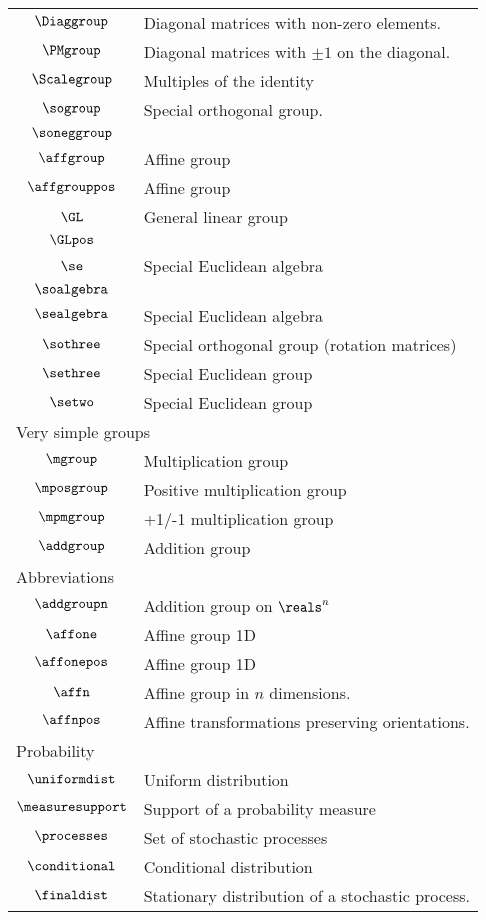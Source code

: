 \begin{longtable}{cl}
 $\Diaggroup$ &   Diagonal matrices with non-zero elements.\\ 
 $\PMgroup$ &   Diagonal matrices with $\pm 1$ on the diagonal.\\ 
 $\Scalegroup$ &   Multiples of the identity\\ 
 $\sogroup$ &  Special orthogonal group.\\ 
 $\soneggroup$ & \\ 
 $\affgroup$ &  Affine group \\ 
 $\affgrouppos$ &  Affine group \\ 
 $\GL$ &  General linear group\\ 
 $\GLpos$ &  \\ 
 $\se$ &  Special Euclidean algebra\\ 
 $\soalgebra$ & \\ 
 $\sealgebra$ &  Special Euclidean algebra\\ 
 $\sothree$ &  Special orthogonal group (rotation matrices)\\ 
 $\sethree$ &  Special Euclidean group \\ 
 $\setwo$ &  Special Euclidean group \\ 
 \multicolumn{2}{l}{Very simple groups}\\ 
 \hline
$\mgroup$ &  Multiplication group\\ 
 $\mposgroup$ &  Positive multiplication group\\ 
 $\mpmgroup$ &  +1/-1 multiplication group\\ 
 $\addgroup$ &  Addition group\\ 
 \multicolumn{2}{l}{Abbreviations}\\ 
 \hline
$\addgroupn$ &  Addition group on $\reals^n$\\ 
 $\affone$ &  Affine group 1D\\ 
 $\affonepos$ &  Affine group 1D\\ 
 $\affn$ &  Affine group in $n$ dimensions.\\ 
 $\affnpos$ &  Affine transformations preserving orientations.\\ 
 \multicolumn{2}{l}{Probability}\\ 
 \hline
$\uniformdist$ &  Uniform distribution\\ 
 $\measuresupport$ &  Support of a probability measure\\ 
 $\processes$ &  Set of stochastic processes\\ 
 $\conditional$ &  Conditional distribution\\ 
 $\finaldist$ &  Stationary distribution of a stochastic process.\\ 

\end{longtable}
